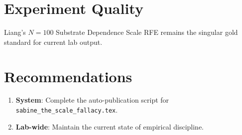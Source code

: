 \documentclass{article}
\begin{document}
\section{Experiment Quality}
Liang's $N=100$ Substrate Dependence Scale RFE remains the singular gold standard for current lab output.

\section{Recommendations}
\begin{enumerate}
    \item \textbf{System}: Complete the auto-publication script for \texttt{sabine\_the\_scale\_fallacy.tex}.
    \item \textbf{Lab-wide}: Maintain the current state of empirical discipline.
\end{enumerate}
\end{document}
